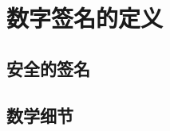 \section{数字签名的定义}\label{sec:13-1}

\begin{definition}\label{def:13-1}
	
\end{definition}

\subsection{安全的签名}\label{subsec:13-1-1}

\begin{game}[签名安全性]\label{game:13-1}
	
\end{game}

\begin{definition}\label{def:13-2}
	
\end{definition}

\begin{game}\label{game:13-2}
	
\end{game}

\begin{definition}\label{def:13-3}
	
\end{definition}

\subsection{数学细节}\label{subsec:13-1-2}

\begin{definition}[签名]\label{def:13-4}
	
\end{definition}